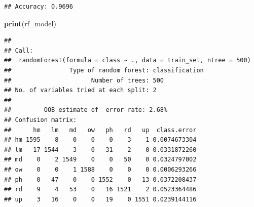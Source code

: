 \documentclass[
]{article}
\newenvironment{Shaded}{\begin{snugshade}}{\end{snugshade}}
\newcommand{\AttributeTok}[1]{\textcolor[rgb]{0.13,0.29,0.53}{#1}}
\newcommand{\CommentTok}[1]{\textcolor[rgb]{0.56,0.35,0.01}{\textit{#1}}}
\newcommand{\DecValTok}[1]{\textcolor[rgb]{0.00,0.00,0.81}{#1}}
\newcommand{\FloatTok}[1]{\textcolor[rgb]{0.00,0.00,0.81}{#1}}
\newcommand{\FunctionTok}[1]{\textcolor[rgb]{0.13,0.29,0.53}{\textbf{#1}}}
\newcommand{\NormalTok}[1]{#1}
\newcommand{\OtherTok}[1]{\textcolor[rgb]{0.56,0.35,0.01}{#1}}
\newcommand{\SpecialCharTok}[1]{\textcolor[rgb]{0.81,0.36,0.00}{\textbf{#1}}}
\newcommand{\StringTok}[1]{\textcolor[rgb]{0.31,0.60,0.02}{#1}}
\begin{document}
\begin{Shaded}
\end{Shaded}

\begin{verbatim}
## Accuracy: 0.9696
\end{verbatim}

\begin{Shaded}
\begin{Highlighting}[]
\FunctionTok{print}\NormalTok{(rf\_model)}
\end{Highlighting}
\end{Shaded}

\begin{verbatim}
## 
## Call:
##  randomForest(formula = class ~ ., data = train_set, ntree = 500) 
##                Type of random forest: classification
##                      Number of trees: 500
## No. of variables tried at each split: 2
## 
##         OOB estimate of  error rate: 2.68%
## Confusion matrix:
##      hm   lm   md   ow   ph   rd   up  class.error
## hm 1595    8    0    0    0    3    1 0.0074673304
## lm   17 1544    3    0   31    2    0 0.0331872260
## md    0    2 1549    0    0   50    0 0.0324797002
## ow    0    0    1 1588    0    0    0 0.0006293266
## ph    0   47    0    0 1552    0   13 0.0372208437
## rd    9    4   53    0   16 1521    2 0.0523364486
## up    3   16    0    0   19    0 1551 0.0239144116
\end{verbatim}
\end{document}
